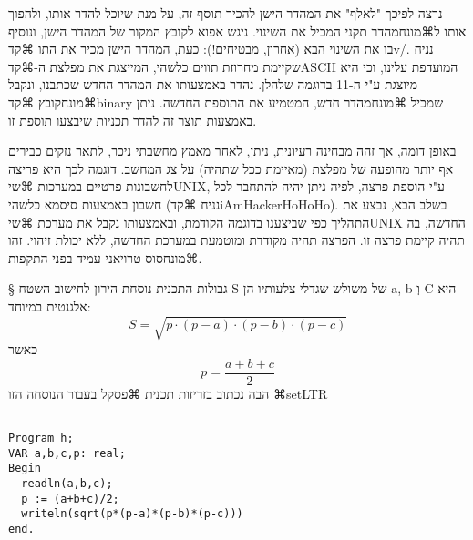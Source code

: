 {נרצה לפיכך "לאלף" את המהדר הישן להכיר תוסף זה, על מנת שיוכל להדר אותו, ולהפוך אותו ל⌘מונח{מהדר} תקני המכיל את השינוי. ניגש אפוא לקובץ המקור של המהדר הישן, ונוסיף בו את השינוי הבא (אחרון, מבטיחים!):
כעת, המהדר הישן מכיר את התו ⌘קד{v/}. נניח שקיימת מחרוזת תווים כלשהי, המייצגת את מפלצת ה-⌘קד{ASCII} המועדפת עלינו, וכי היא מיוצגת ע"י ה-11 בדוגמה שלהלן. נהדר באמצעותו את המהדר החדש שכתבנו, ונקבל ⌘מונח{קובץ} ⌘קד{binary} שמכיל ⌘מונח{מהדר} חדש, המטמיע את התוספת החדשה. ניתן באמצעות תוצר זה להדר תכניות שיבצעו תוספת זו.

באופן דומה, אך זהה מבחינה רעיונית, ניתן, לאחר מאמץ מחשבתי ניכר, לתאר נזקים כבירים אף יותר מהופעה של מפלצת (מאיימת ככל שתהיה) על צג המחשב. דוגמה לכך היא פריצה לחשבונות פרטיים במערכות ⌘שי{UNIX}, ע"י הוספת פרצה, לפיה ניתן יהיה להתחבר לכל חשבון באמצעות סיסמא כלשהי (נניח ⌘קד{iAmHackerHoHoHo}). בשלב הבא, נבצע את התהליך כפי שביצענו בדוגמה הקודמת, ובאמצעותו נקבל את מערכת ⌘שי{UNIX} החדשה, בה תהיה קיימת פרצה זו. הפרצה תהיה מקודדת ומוטמעת במערכת החדשה, ללא יכולת זיהוי. זהו ⌘מונח{סוס טרויאני} עמיד בפני התקפות.

§ גבולות התכנית
נוסחת הירון לחישוב השטח S של משולש שגדלי צלעותיו הן a, b  וְ C היא אלגנטית במיוחד:
\[
S=\sqrt{p\cdot(p-a)\cdot(p-b)\cdot(p-c)}
\]
כאשר
\[
p=\frac{a+b+c}{2}
\]
הבה נכתוב בזריזות תכנית ⌘פסקל בעבור הנוסחה הזו
⌘setLTR{}
\lstset{language=Pascal}
\begin{lstlisting}[frame=single]

Program h;
VAR a,b,c,p: real;
Begin
  readln(a,b,c);
  p := (a+b+c)/2;
  writeln(sqrt(p*(p-a)*(p-b)*(p-c)))
end.


\end{lstlisting}}
